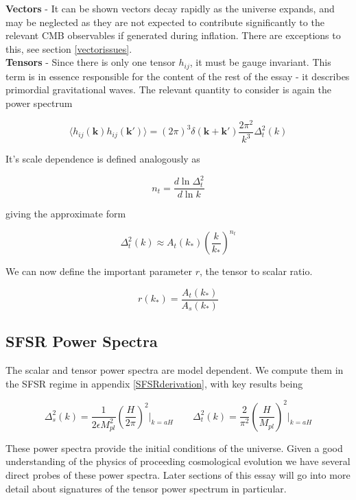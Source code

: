 \documentclass[a4paper,10pt]{article}
\renewcommand{\v}[1]{\mathbf{#1}}
\newcommand{\Mp}{M_{pl}}
\begin{document}
\textbf{Vectors} - It can be shown vectors decay rapidly as the universe expands, and may be neglected as they are not expected to contribute significantly to the relevant CMB observables if generated during inflation. There are exceptions to this, see section \ref{vectorissues}.\\

\textbf{Tensors} - Since there is only one tensor $h_{ij}$, it must be gauge invariant. This term is in essence responsible for the content of the rest of the essay - it describes primordial gravitational waves. The relevant quantity to consider is again the power spectrum

\begin{equation}
\langle h_{ij}(\v{k})h_{ij}(\v{k'}) \rangle=(2\pi)^3\delta(\v{k}+\v{k'})\frac{2\pi^2}{k^3}\Delta^2_t(k)
\end{equation}

It's scale dependence is defined analogously as 

\begin{equation}
n_t = \frac{d\ln{\Delta^2_t}}{d\ln{k}}
\end{equation}

giving the approximate form 

\begin{equation}
\Delta^2_t(k) \approx A_t(k_*)(\frac{k}{k_*})^{n_t}
\end{equation}

We can now define the important parameter $r$, the tensor to scalar ratio.

\begin{equation}
r(k_*)=\frac{A_t(k_*)}{A_s(k_*)} 
\end{equation}

\subsection{SFSR Power Spectra}

The scalar and tensor power spectra are model dependent. We compute them in the SFSR regime in appendix \ref{SFSRderivation}, with key results being

\begin{equation}
\Delta^2_{s}(k) = \frac{1}{2\epsilon\Mp^2}\left(\frac{H}{2\pi}\right)^2\rvert_{k=aH} \qquad
\Delta^2_t(k)= \frac{2}{\pi^2}\left(\frac{H}{\Mp}\right)^2\rvert_{k=aH}
\end{equation}

These power spectra provide the initial conditions of the universe. Given a good understanding of the physics of proceeding cosmological evolution we have several direct probes of these power spectra. Later sections of this essay will go into more detail about signatures of the tensor power spectrum in particular.\\
\end{document}
